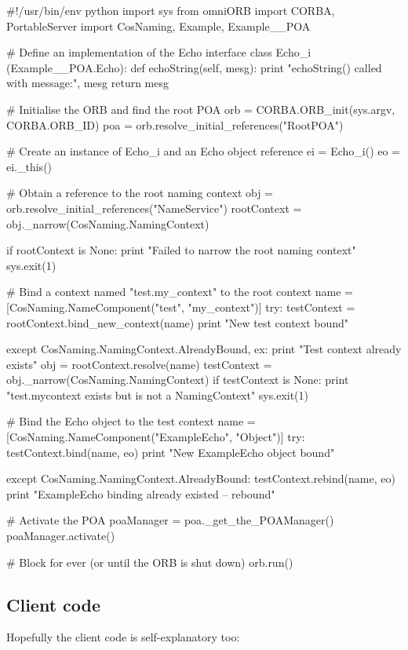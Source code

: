 \documentclass[11pt,twoside,a4paper]{book}
\begin{document}
\begin{pylisting}
#!/usr/bin/env python
import sys
from omniORB import CORBA, PortableServer
import CosNaming, Example, Example__POA

# Define an implementation of the Echo interface
class Echo_i (Example__POA.Echo):
    def echoString(self, mesg):
        print "echoString() called with message:", mesg
        return mesg

# Initialise the ORB and find the root POA
orb = CORBA.ORB_init(sys.argv, CORBA.ORB_ID)
poa = orb.resolve_initial_references("RootPOA")

# Create an instance of Echo_i and an Echo object reference
ei = Echo_i()
eo = ei._this()

# Obtain a reference to the root naming context
obj         = orb.resolve_initial_references("NameService")
rootContext = obj._narrow(CosNaming.NamingContext)

if rootContext is None:
    print "Failed to narrow the root naming context"
    sys.exit(1)

# Bind a context named "test.my_context" to the root context
name = [CosNaming.NameComponent("test", "my_context")]
try:
    testContext = rootContext.bind_new_context(name)
    print "New test context bound"
    
except CosNaming.NamingContext.AlreadyBound, ex:
    print "Test context already exists"
    obj = rootContext.resolve(name)
    testContext = obj._narrow(CosNaming.NamingContext)
    if testContext is None:
        print "test.mycontext exists but is not a NamingContext"
        sys.exit(1)

# Bind the Echo object to the test context
name = [CosNaming.NameComponent("ExampleEcho", "Object")]
try:
    testContext.bind(name, eo)
    print "New ExampleEcho object bound"

except CosNaming.NamingContext.AlreadyBound:
    testContext.rebind(name, eo)
    print "ExampleEcho binding already existed -- rebound"

# Activate the POA
poaManager = poa._get_the_POAManager()
poaManager.activate()

# Block for ever (or until the ORB is shut down)
orb.run()
\end{pylisting}


\subsection{Client code}

Hopefully the client code is self-explanatory too:
\end{document}
